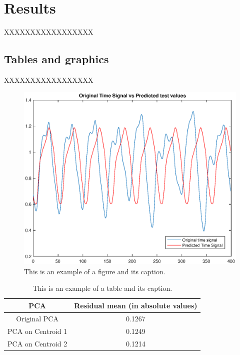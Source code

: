 \chapter{Results}

XXXXXXXXXXXXXXXXX

\section{Tables and graphics}

XXXXXXXXXXXXXXXXX

\begin{figure}[!ht]
\includegraphics[clip,width=\columnwidth]{figures/PlotTimeSeriesResult}%
\caption[Graph.]{This is an example of a figure and its caption.}
\label{fig:timeseries}
\end{figure}

\begin{table}[!ht]
\renewcommand{\arraystretch}{1.50}
\caption{This is an example of a table and its caption.}
\label{tablePCA}
\centering
\begin{tabular}{| c | c |}
\hline
\bfseries PCA & \bfseries Residual mean (in absolute values) \\
\hline\hline
Original PCA & 0.1267  \\
\hline
PCA on Centroid 1 & 0.1249\\
\hline
PCA on Centroid 2 & 0.1214  \\
\hline
\end{tabular}
\end{table}

\newpage



